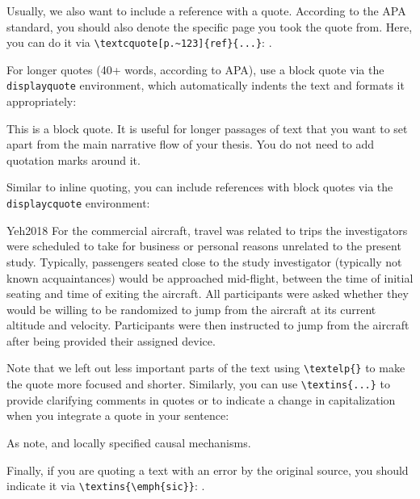 Usually, we also want to include a reference with a quote. According to the APA standard, you should also denote the
specific page you took the quote from. Here, you can do it via \verb|\textcquote[p.~123]{ref}{...}|:
.

For longer quotes (40+ words, according to APA), use a block quote via the \verb|displayquote| environment,
which automatically indents the text and formats it appropriately:
\begin{displayquote}
    This is a block quote. It is useful for longer passages of text that you want to set apart from the main
    narrative flow of your thesis. You do not need to add quotation marks around it.
\end{displayquote}

Similar to inline quoting, you can include references with block quotes via the \verb|displaycquote| environment:
\begin{displaycquote}[pp.~1--2]{Yeh2018}
    For the commercial aircraft, travel was related to trips the investigators were scheduled to take for business
    or personal reasons unrelated to the present study. Typically, passengers seated close to the study investigator
    (typically not known acquaintances) would be approached mid-flight, between the time of initial seating and
    time of exiting the aircraft. \textelp{} All participants were asked whether they would be willing to be
    randomized to jump from the aircraft at its current altitude and velocity. \textelp{} Participants were
    then instructed to jump from the aircraft after being provided their assigned device.
\end{displaycquote}
Note that we left out less important parts of the text using \verb|\textelp{}| to make the quote more focused
and shorter. Similarly, you can use \verb|\textins{...}| to provide clarifying comments in quotes or to indicate a
change in capitalization when you integrate a quote in your sentence:
\begin{displayquote}
    As \citet[p.~{16,263}]{Toth2022} note, 
    and locally specified causal mechanisms.
\end{displayquote}
Finally, if you are quoting a text with an error by the original source, you should indicate it
via \verb|\textins{\emph{sic}}|: .


